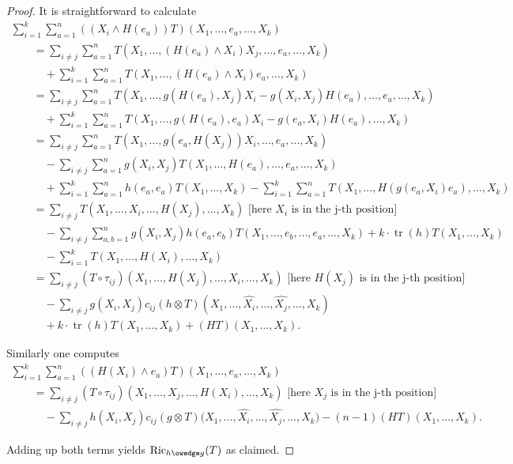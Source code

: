 \documentclass[10pt,a4paper]{amsart}
\numberwithin{equation}{section}
\newcommand{\Ric} {\operatorname{Ric}}
\newcommand{ \tr } {\operatorname{tr}}
\begin{document}
\begin{proof}
It is straightforward to calculate
\begin{gather*}
\sum_{i=1}^k \sum_{a=1}^n  ((X_i \wedge H(e_a)) T)(X_1, \dots, e_a, \dots, X_k) \\
\qquad{} =  \sum_{i \neq j} \sum_{a=1}^n T( X_1, \dots, (H(e_a) \wedge X_i) X_j, \dots, e_a, \dots, X_k) \\
 \qquad\quad{} + \sum_{i=1}^k \sum_{a=1}^n T(X_1, \dots, (H(e_a) \wedge X_i)e_a, \dots, X_k) \\
\qquad {}=  \sum_{i \neq j} \sum_{a=1}^n T( X_1, \dots, g(H(e_a), X_j) X_i - g(X_i, X_j)H(e_a), \dots, e_a, \dots, X_k) \\
\qquad\quad{}+ \sum_{i=1}^k \sum_{a=1}^n T(X_1, \dots, g(H(e_a),e_a) X_i - g(e_a, X_i) H(e_a), \dots, X_k) \\
\qquad {}=  \sum_{i \neq j} \sum_{a=1}^n T( X_1, \dots, g(e_a, H(X_j)) X_i, \dots, e_a, \dots, X_k) \\
\qquad\quad{} - \sum_{i \neq j} \sum_{a=1}^n g(X_i, X_j) T( X_1, \dots, H(e_a), \dots, e_a, \dots, X_k) \\
 \qquad\quad{}+ \sum_{i=1}^k \sum_{a=1}^n h(e_a,e_a) T(X_1, \dots, X_k)
 - \sum_{i=1}^k \sum_{a=1}^n T(X_1, \dots, H  ( g(e_a, X_i)e_a  ), \dots, X_k) \\
\qquad {}=  \sum_{i \neq j} T ( X_1, \dots, X_i, \dots, H(X_j), \dots, X_k) \text{ [here } X_i \text{ is in the j-th position]} \\
\qquad\quad{}- \sum_{i \neq j} \sum_{a,b=1}^n  g(X_i, X_j) h(e_a, e_b) T( X_1, \dots, e_b, \dots, e_a, \dots, X_k)
 + k \cdot \tr( h ) T(X_1, \dots, X_k) \\
\qquad\quad{} - \sum_{i=1}^k T(X_1, \dots, H(X_i), \dots, X_k) \\
\qquad {}=  \sum_{i \neq j} (T \circ \tau_{ij}) ( X_1, \dots, H(X_j), \dots, X_i, \dots, X_k) \text{ [here } H(X_j) \text{ is in the j-th position]} \\
\qquad\quad{} - \sum_{i \neq j} g(X_i, X_j) c_{ij} (h \otimes T)( X_1, \dots, \widehat{X_i}, \dots, \widehat{X_j}, \dots, X_k) \\
 \qquad\quad{} + k \cdot \tr( h ) T(X_1, \dots, X_k)  + (HT)(X_1, \dots, X_k).
\end{gather*}

Similarly one computes
\begin{gather*}
\sum_{i=1}^k \sum_{a=1}^n   ((H(X_i) \wedge e_a) T)(X_1, \dots, e_a, \dots, X_k) \\
\qquad{} =   \sum_{i \neq j} (T \circ \tau_{ij}) ( X_1, \dots, X_j, \dots, H(X_i), \dots, X_k) \text{ [here } X_j \text{ is in the j-th position]} \\
\qquad\quad{}  -\! \sum_{i \neq j} h(X_i, X_j) c_{ij} (g \otimes T)\big(X_1, {\dots}, \widehat{X_i}, {\dots}, \widehat{X_j}, {\dots}, X_k\big)   - (n-1) (HT) (X_1, {\dots}, X_k) .
\end{gather*}

Adding up both terms yields $\Ric_{h \owedge g}(T)$ as claimed.
\end{proof}
\end{document}
